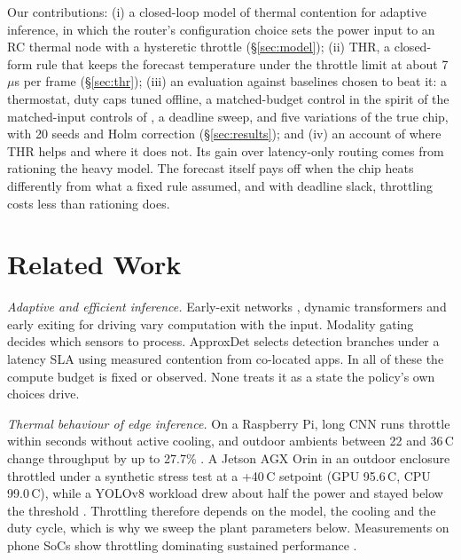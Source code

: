 \documentclass[conference,compsoc]{IEEEtran}
\newcommand{\degc}{\,\textdegree C}
\begin{document}
Our contributions:
(i) a closed-loop model of thermal contention for adaptive inference,
in which the router's configuration choice sets the power input to an
RC thermal node with a hysteretic throttle (\S\ref{sec:model});
(ii) THR, a closed-form rule that keeps the forecast temperature under
the throttle limit at about 7\,$\mu$s per frame (\S\ref{sec:thr});
(iii) an evaluation against baselines chosen to beat it: a thermostat,
duty caps tuned offline, a matched-budget control in the spirit of the
matched-input controls of \cite{zhou2026matchedinput}, a deadline
sweep, and five variations of the true chip, with 20 seeds and Holm
correction (\S\ref{sec:results}); and
(iv) an account of where THR helps and where it does not. Its gain
over latency-only routing comes from rationing the heavy model. The
forecast itself pays off when the chip heats differently from what a
fixed rule assumed, and with deadline slack, throttling costs less than
rationing does.

\section{Related Work}

\textit{Adaptive and efficient inference.} Early-exit networks
\cite{teerapittayanon2016branchynet,laskaridis2021adaptive}, dynamic
transformers \cite{wang2021notallimages} and early exiting for driving
\cite{adee2025,navee2025,temporalpatience2023} vary computation with
the input. Modality gating \cite{dynmm,mees2016choosing,pramr2025}
decides which sensors to process. ApproxDet \cite{xu2020approxdet}
selects detection branches under a latency SLA using measured
contention from co-located apps. In all of these the compute budget is
fixed or observed. None treats it as a state the policy's own choices
drive.

\textit{Thermal behaviour of edge inference.} On a Raspberry Pi, long
CNN runs throttle within seconds without active cooling, and outdoor
ambients between 22 and 36\degc{} change throughput by up to 27.7\%
\cite{benoitcattin2020throttling}. A Jetson AGX Orin in an outdoor
enclosure throttled under a synthetic stress test at a +40\degc{}
setpoint (GPU 95.6\degc, CPU 99.0\degc), while a YOLOv8 workload drew
about half the power and stayed below the threshold
\cite{krislauks2026orin}. Throttling therefore depends on the model,
the cooling and the duty cycle, which is why we sweep the plant
parameters below. Measurements on phone SoCs show throttling dominating
sustained performance \cite{bhat2019power}.
\end{document}
